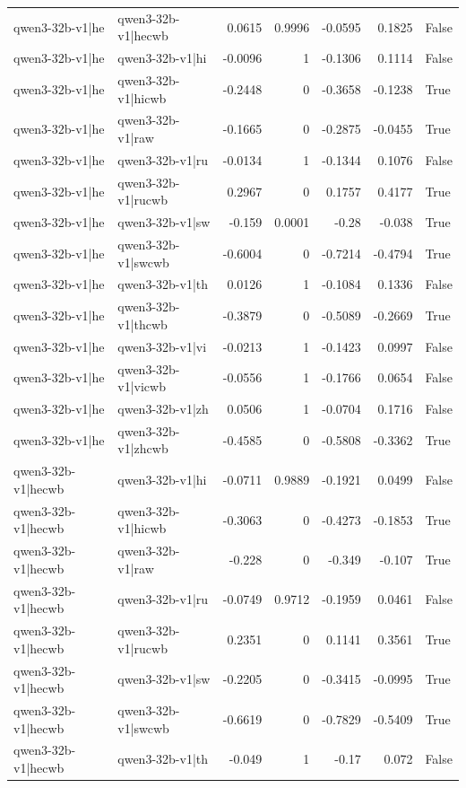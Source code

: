 \begin{table}
\begin{tabular}{l l r r r r l}
qwen3-32b-v1|he & qwen3-32b-v1|hecwb & 0.0615 & 0.9996 & -0.0595 & 0.1825 & False \\
qwen3-32b-v1|he & qwen3-32b-v1|hi & -0.0096 & 1 & -0.1306 & 0.1114 & False \\
qwen3-32b-v1|he & qwen3-32b-v1|hicwb & -0.2448 & 0 & -0.3658 & -0.1238 & True \\
qwen3-32b-v1|he & qwen3-32b-v1|raw & -0.1665 & 0 & -0.2875 & -0.0455 & True \\
qwen3-32b-v1|he & qwen3-32b-v1|ru & -0.0134 & 1 & -0.1344 & 0.1076 & False \\
qwen3-32b-v1|he & qwen3-32b-v1|rucwb & 0.2967 & 0 & 0.1757 & 0.4177 & True \\
qwen3-32b-v1|he & qwen3-32b-v1|sw & -0.159 & 0.0001 & -0.28 & -0.038 & True \\
qwen3-32b-v1|he & qwen3-32b-v1|swcwb & -0.6004 & 0 & -0.7214 & -0.4794 & True \\
qwen3-32b-v1|he & qwen3-32b-v1|th & 0.0126 & 1 & -0.1084 & 0.1336 & False \\
qwen3-32b-v1|he & qwen3-32b-v1|thcwb & -0.3879 & 0 & -0.5089 & -0.2669 & True \\
qwen3-32b-v1|he & qwen3-32b-v1|vi & -0.0213 & 1 & -0.1423 & 0.0997 & False \\
qwen3-32b-v1|he & qwen3-32b-v1|vicwb & -0.0556 & 1 & -0.1766 & 0.0654 & False \\
qwen3-32b-v1|he & qwen3-32b-v1|zh & 0.0506 & 1 & -0.0704 & 0.1716 & False \\
qwen3-32b-v1|he & qwen3-32b-v1|zhcwb & -0.4585 & 0 & -0.5808 & -0.3362 & True \\
qwen3-32b-v1|hecwb & qwen3-32b-v1|hi & -0.0711 & 0.9889 & -0.1921 & 0.0499 & False \\
qwen3-32b-v1|hecwb & qwen3-32b-v1|hicwb & -0.3063 & 0 & -0.4273 & -0.1853 & True \\
qwen3-32b-v1|hecwb & qwen3-32b-v1|raw & -0.228 & 0 & -0.349 & -0.107 & True \\
qwen3-32b-v1|hecwb & qwen3-32b-v1|ru & -0.0749 & 0.9712 & -0.1959 & 0.0461 & False \\
qwen3-32b-v1|hecwb & qwen3-32b-v1|rucwb & 0.2351 & 0 & 0.1141 & 0.3561 & True \\
qwen3-32b-v1|hecwb & qwen3-32b-v1|sw & -0.2205 & 0 & -0.3415 & -0.0995 & True \\
qwen3-32b-v1|hecwb & qwen3-32b-v1|swcwb & -0.6619 & 0 & -0.7829 & -0.5409 & True \\
qwen3-32b-v1|hecwb & qwen3-32b-v1|th & -0.049 & 1 & -0.17 & 0.072 & False \\

\end{tabular}
\end{table}

